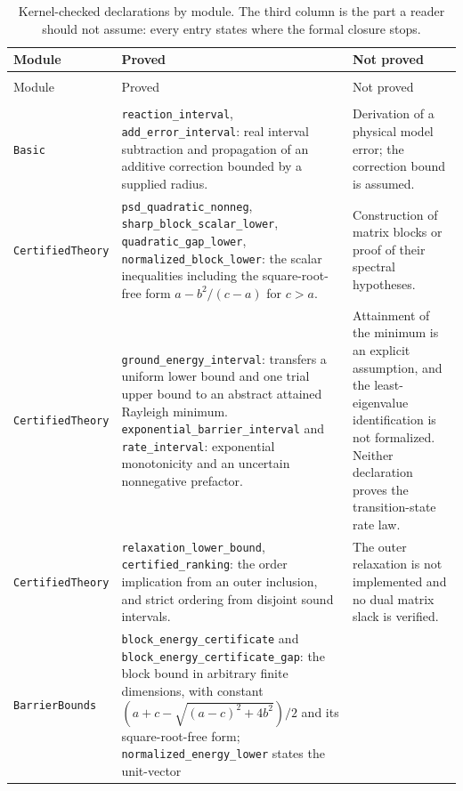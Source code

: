 \documentclass[11pt,a4paper]{article}
\theoremstyle{plain}
\theoremstyle{definition}
\theoremstyle{remark}
\begin{document}
\begin{longtable}{@{}>{\raggedright\arraybackslash}p{}>{\raggedright\arraybackslash}p{}>{\raggedright\arraybackslash}p{}@{}}
\caption{Kernel-checked declarations by module. The third column is the part a
reader should not assume: every entry states where the formal closure stops.}
\label{tab:lean}\\
\hline
Module & Proved & Not proved \\
\hline
\endfirsthead
\multicolumn{3}{@{}l}{\small\itshape Table~\thetable\ (continued)}\\
\hline
Module & Proved & Not proved \\
\hline
\endhead
\hline
\multicolumn{3}{r@{}}{\small\itshape continued on the next page}\\
\endfoot
\hline
\endlastfoot
\texttt{Basic} &
\texttt{reaction\_interval}, \texttt{add\_error\_interval}: real interval
subtraction and propagation of an additive correction bounded by a supplied
radius. &
Derivation of a physical model error; the correction bound is assumed. \\
\hline
\texttt{CertifiedTheory} &
\texttt{psd\_quadratic\_nonneg},
\texttt{sharp\_block\_scalar\_lower},
\texttt{quadratic\_gap\_lower},
\texttt{normalized\_block\_lower}: the scalar inequalities including the
square-root-free form $a-b^{2}/(c-a)$ for $c>a$. &
Construction of matrix blocks or proof of their spectral hypotheses. \\
\hline
\texttt{CertifiedTheory} &
\texttt{ground\_energy\_interval}: transfers a uniform lower bound and one trial
upper bound to an abstract attained Rayleigh minimum.
\texttt{exponential\_barrier\_interval} and \texttt{rate\_interval}: exponential
monotonicity and an uncertain nonnegative prefactor. &
Attainment of the minimum is an explicit assumption, and the least-eigenvalue
identification is not formalized. Neither declaration proves the
transition-state rate law. \\
\hline
\texttt{CertifiedTheory} &
\texttt{relaxation\_lower\_bound}, \texttt{certified\_ranking}: the order
implication from an outer inclusion, and strict ordering from disjoint sound
intervals. &
The outer relaxation is not implemented and no dual matrix slack is verified. \\
\hline
\texttt{BarrierBounds} &
\texttt{block\_energy\_certificate} and
\texttt{block\_energy\_certificate\_gap}: the block bound in arbitrary finite
dimensions, with constant $(a+c-\sqrt{(a-c)^2+4b^2})/2$ and its
square-root-free form; \texttt{normalized\_energy\_lower} states the unit-vector

\end{longtable}
\end{document}
